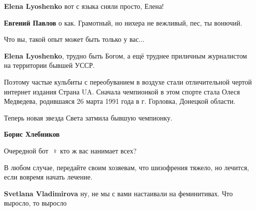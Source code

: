 \begin{itemize}
\begin{itemize}
\textbf{Elena Lyoshenko} вот с языка сняли просто, Елена!

 
\textbf{Евгений Павлов} о как. Грамотный, но нихера не вежливый, пес, ты вонючий.

 
Что вы, такой опыт может быть только у вас...

 

\textbf{Elena Lyoshenko}, трудно быть Богом, а ещё труднее приличным журналистом на территории бывшей УССР.

Поэтому частые кульбиты с переобуванием в воздухе стали отличительной чертой
интернет издания Страна UA. Сначала чемпионкой в этом спорте стала Олеся
Медведева, родившаяся 26 марта 1991 года в г. Горловка, Донецкой области.

Теперь новая звезда Света затмила бывшую чемпионку.

 

\textbf{Борис Хлебников}

Очередной бот 🤦♀️ кто ж вас нанимает всех?

В любом случае, передайте своим хозяевам, что шизофрения тяжело, но лечится,
если вовремя начать лечение.


 

\textbf{Svetlana Vladimirova} ну, не мы с вами настаивали на феминитивах. Что выросло, то выросло


\end{itemize}
\end{itemize}
